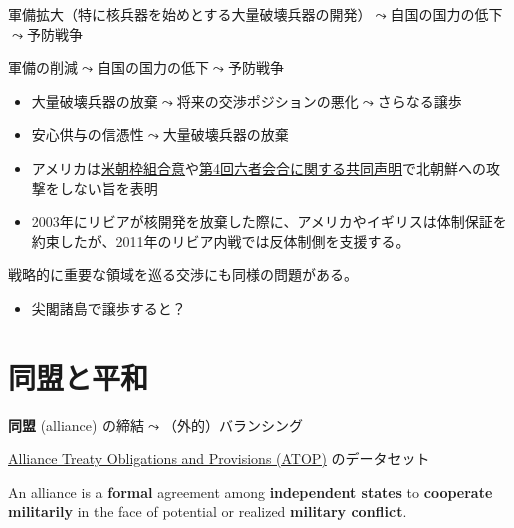 \documentclass[
  xelatex,
  ja=standard]{bxjsarticle}
\providecommand{\tightlist}{%
  \setlength{\itemsep}{0pt}\setlength{\parskip}{0pt}}\usepackage{longtable,booktabs,array}
\begin{document}
軍備拡大（特に核兵器を始めとする大量破壊兵器の開発）\(\leadsto\)自国の国力の低下\(\leadsto\)予防戦争

軍備の削減\(\leadsto\)自国の国力の低下\(\leadsto\)予防戦争

\begin{itemize}
\tightlist
\item
  大量破壊兵器の放棄\(\leadsto\)将来の交渉ポジションの悪化\(\leadsto\)さらなる譲歩
\item
  安心供与の信憑性\(\leadsto\)大量破壊兵器の放棄
\item
  アメリカは\href{https://peacemaker.un.org/node/1129}{米朝枠組合意}や\href{https://www.mofa.go.jp/mofaj/area/n_korea/6kaigo/ks_050919.html}{第4回六者会合に関する共同声明}で北朝鮮への攻撃をしない旨を表明
\item
  2003年にリビアが核開発を放棄した際に、アメリカやイギリスは体制保証を約束したが、2011年のリビア内戦では反体制側を支援する。
\end{itemize}

戦略的に重要な領域を巡る交渉にも同様の問題がある。

\begin{itemize}
\tightlist
\item
  尖閣諸島で譲歩すると？
\end{itemize}

\hypertarget{ux540cux76dfux3068ux5e73ux548c}{%
\section{同盟と平和}\label{ux540cux76dfux3068ux5e73ux548c}}

\textbf{同盟} (alliance) の締結\(\leadsto\)（外的）バランシング

\href{http://www.atopdata.org/}{Alliance Treaty Obligations and
Provisions (ATOP)} のデータセット\citep{leeds2002}

\begin{tcolorbox}[enhanced jigsaw, coltitle=black, colbacktitle=quarto-callout-note-color!10!white, colframe=quarto-callout-note-color-frame, bottomrule=.15mm, toprule=.15mm, breakable, leftrule=.75mm, toptitle=1mm, left=2mm, arc=.35mm, bottomtitle=1mm, opacitybacktitle=0.6, titlerule=0mm, title=\textcolor{quarto-callout-note-color}{\faInfo}\hspace{0.5em}{\href{http://www.atopdata.org/uploads/6/9/1/3/69134503/atop_5_1_codebook.pdf}{ATOPにおける同盟の定義}}, colback=white, opacityback=0, rightrule=.15mm]

An alliance is a \textbf{formal} agreement among \textbf{independent
states} to \textbf{cooperate militarily} in the face of potential or
realized \textbf{military conflict}.

\end{tcolorbox}
\end{document}
